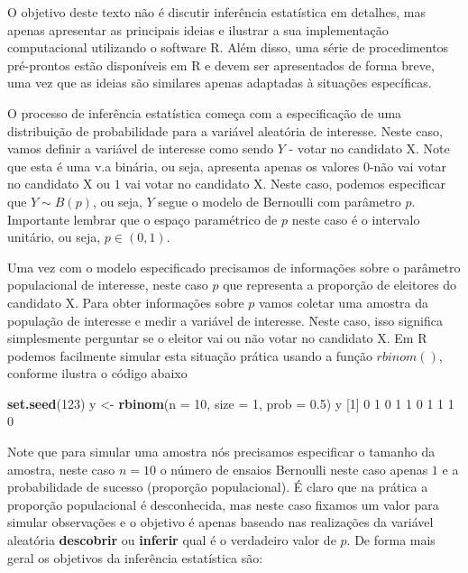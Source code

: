 \documentclass[10pt,a4paper]{book}
\newenvironment{Shaded}{\begin{snugshade}}{\end{snugshade}}
\newcommand{\KeywordTok}[1]{\textcolor[rgb]{0.13,0.29,0.53}{\textbf{#1}}}
\newcommand{\DataTypeTok}[1]{\textcolor[rgb]{0.13,0.29,0.53}{#1}}
\newcommand{\DecValTok}[1]{\textcolor[rgb]{0.00,0.00,0.81}{#1}}
\newcommand{\FloatTok}[1]{\textcolor[rgb]{0.00,0.00,0.81}{#1}}
\newcommand{\StringTok}[1]{\textcolor[rgb]{0.31,0.60,0.02}{#1}}
\newcommand{\NormalTok}[1]{#1}
\begin{document}
O objetivo deste texto não é discutir inferência estatística em
detalhes, mas apenas apresentar as principais ideias e ilustrar a sua
implementação computacional utilizando o software R. Além disso, uma
série de procedimentos pré-prontos estão disponíveis em R e devem ser
apresentados de forma breve, uma vez que as ideias são similares apenas
adaptadas à situações específicas.

O processo de inferência estatística começa com a especificação de uma
distribuição de probabilidade para a variável aleatória de interesse.
Neste caso, vamos definir a variável de interesse como sendo \(Y\) -
votar no candidato X. Note que esta é uma v.a binária, ou seja,
apresenta apenas os valores \(0\)-não vai votar no candidato X ou \(1\)
vai votar no candidato X. Neste caso, podemos especificar que
\(Y \sim B(p)\), ou seja, \(Y\) segue o modelo de Bernoulli com
parâmetro \(p\). Importante lembrar que o espaço paramétrico de \(p\)
neste caso é o intervalo unitário, ou seja, \(p \in (0,1)\).

Uma vez com o modelo especificado precisamos de informações sobre o
parâmetro populacional de interesse, neste caso \(p\) que representa a
proporção de eleitores do candidato X. Para obter informações sobre
\(p\) vamos coletar uma amostra da população de interesse e medir a
variável de interesse. Neste caso, isso significa simplesmente perguntar
se o eleitor vai ou não votar no candidato X. Em R podemos facilmente
simular esta situação prática usando a função \(rbinom()\), conforme
ilustra o código abaixo

\begin{Shaded}
\begin{Highlighting}[]
\KeywordTok{set.seed}\NormalTok{(}\DecValTok{123}\NormalTok{)}
\NormalTok{y <-}\StringTok{ }\KeywordTok{rbinom}\NormalTok{(}\DataTypeTok{n =} \DecValTok{10}\NormalTok{, }\DataTypeTok{size =} \DecValTok{1}\NormalTok{, }\DataTypeTok{prob =} \FloatTok{0.5}\NormalTok{)}
\NormalTok{y}
\NormalTok{ [}\DecValTok{1}\NormalTok{] }\DecValTok{0} \DecValTok{1} \DecValTok{0} \DecValTok{1} \DecValTok{1} \DecValTok{0} \DecValTok{1} \DecValTok{1} \DecValTok{1} \DecValTok{0}
\end{Highlighting}
\end{Shaded}

Note que para simular uma amostra nós precisamos especificar o tamanho
da amostra, neste caso \(n=10\) o número de ensaios Bernoulli neste caso
apenas \(1\) e a probabilidade de sucesso (proporção populacional). É
claro que na prática a proporção populacional é desconhecida, mas neste
caso fixamos um valor para simular observações e o objetivo é apenas
baseado nas realizações da variável aleatória \textbf{descobrir} ou
\textbf{inferir} qual é o verdadeiro valor de \(p\). De forma mais geral
os objetivos da inferência estatística são:
\end{document}

